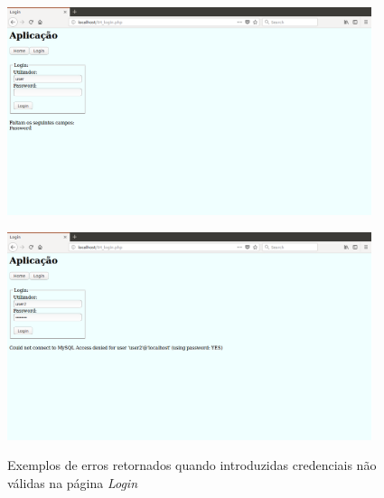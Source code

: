 \documentclass[11pt,twoside,a4paper]{report}
\begin{document}
\begin{figure}[H]
	\centering
	\begin{minipage}{.5\textwidth}
		\begin{center}
			\includegraphics[width=0.95\textwidth]{login02} %
			\label{fig:login2}
		\end{center}
	\end{minipage}%
	\begin{minipage}{.5\textwidth}
		\begin{center}
			\includegraphics[width=0.95\textwidth]{login03} %
			\label{fig:login3}
		\end{center}
	\end{minipage}
	\caption{Exemplos de erros retornados quando introduzidas credenciais não válidas na página \textit{Login}}
	\label{fig:login1}
\end{figure}
\end{document}
